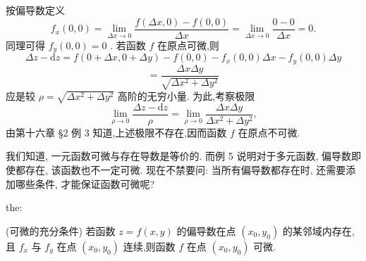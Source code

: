 \begin{solution}

\end{solution}
按偏导数定义
\[
{f}_{x}\left( {0,0}\right)  = \mathop{\lim }\limits_{{{\Delta x} \rightarrow  0}}\frac{f\left( {{\Delta x},0}\right)  - f\left( {0,0}\right) }{\Delta x} = \mathop{\lim }\limits_{{{\Delta x} \rightarrow  0}}\frac{0 - 0}{\Delta x} = 0.
\]
同理可得 \({f}_{y}\left( {0,0}\right)  = 0\) . 若函数 \(f\) 在原点可微,则
\[
{\Delta z} - \mathrm{d}z = f\left( {0 + {\Delta x},0 + {\Delta y}}\right)  - f\left( {0,0}\right)  - {f}_{x}\left( {0,0}\right) {\Delta x} - {f}_{y}\left( {0,0}\right) {\Delta y}
\]
\[
= \frac{\Delta x\Delta y}{\sqrt{\Delta {x}^{2} + \Delta {y}^{2}}}
\]
应是较 \(\rho  = \sqrt{\Delta {x}^{2} + \Delta {y}^{2}}\) 高阶的无穷小量. 为此,考察极限
\[
\mathop{\lim }\limits_{{\rho  \rightarrow  0}}\frac{{\Delta z} - \mathrm{d}z}{\rho } = \mathop{\lim }\limits_{{\rho  \rightarrow  0}}\frac{\Delta x\Delta y}{\Delta {x}^{2} + \Delta {y}^{2}},
\]
由第十六章 §2 例 3 知道,上述极限不存在,因而函数 \(f\) 在原点不可微.

我们知道, 一元函数可微与存在导数是等价的. 而例 5 说明对于多元函数, 偏导数即使都存在, 该函数也不一定可微. 现在不禁要问: 当所有偏导数都存在时, 还需要添加哪些条件, 才能保证函数可微呢?

\begin{theorem}{}{the:}

\end{theorem}
 (可微的充分条件) 若函数 \(z = f\left( {x,y}\right)\) 的偏导数在点 \(\left( {{x}_{0},{y}_{0}}\right)\) 的某邻域内存在,且 \({f}_{x}\) 与 \({f}_{y}\) 在点 \(\left( {{x}_{0},{y}_{0}}\right)\) 连续,则函数 \(f\) 在点 \(\left( {{x}_{0},{y}_{0}}\right)\) 可微.

